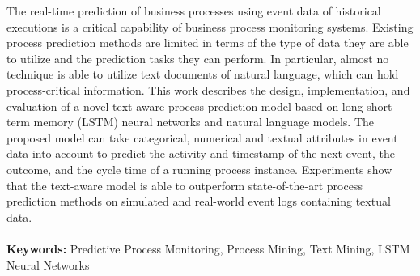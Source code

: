 The real-time prediction of business processes using event data of historical executions is a critical capability of business process monitoring systems.
Existing process prediction methods are limited in terms of the type of data they are able to utilize and the prediction tasks they can perform.
In particular, almost no technique is able to utilize text documents of natural language, which can hold process-critical information.
This work describes the design, implementation, and evaluation of a novel text-aware process prediction model based on long short-term memory (LSTM) neural networks and natural language models.
The proposed model can take categorical, numerical and textual attributes in event data into account to predict the activity and timestamp of the next event, the outcome, and the cycle time of a running process instance.
Experiments show that the text-aware model is able to outperform state-of-the-art process prediction methods on simulated and real-world event logs containing textual data.
\\\\
\textbf{Keywords:} Predictive Process Monitoring, Process Mining, Text Mining, LSTM Neural Networks